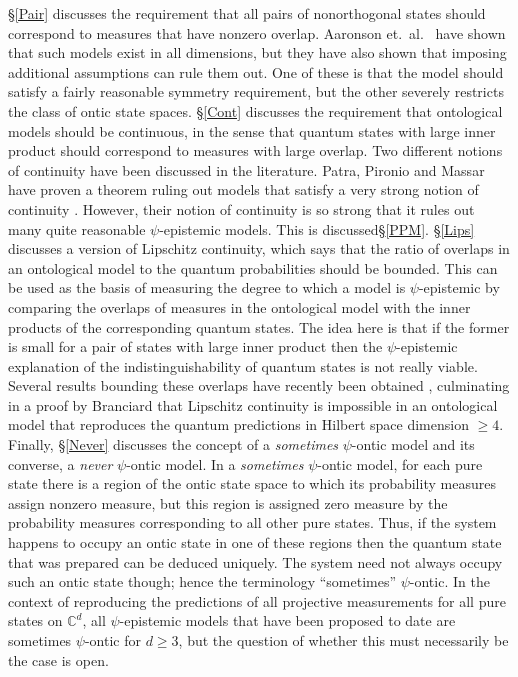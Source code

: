 \documentclass[DIV=calc,fontsize=12pt]{scrartcl} %
\theoremstyle{definition}
\theoremstyle{plain}
\begin{document}
\S\ref{Pair} discusses the requirement that all pairs of nonorthogonal
states should correspond to measures that have nonzero overlap.
Aaronson et.\ al.\ \cite{Aaronson2013} have shown that such models
exist in all dimensions, but they have also shown that imposing
additional assumptions can rule them out.  One of these is that the
model should satisfy a fairly reasonable symmetry requirement, but the
other severely restricts the class of ontic state spaces. \S\ref{Cont}
discusses the requirement that ontological models should be
continuous, in the sense that quantum states with large inner product
should correspond to measures with large overlap.  Two different
notions of continuity have been discussed in the literature.  Patra,
Pironio and Massar have proven a theorem ruling out models that
satisfy a very strong notion of continuity \cite{Patra2013a}.
However, their notion of continuity is so strong that it rules out
many quite reasonable $\psi$-epistemic models.  This is
discussed\S\ref{PPM}.  \S\ref{Lips} discusses a version of Lipschitz
continuity, which says that the ratio of overlaps in an ontological
model to the quantum probabilities should be bounded.  This can be
used as the basis of measuring the degree to which a model is
$\psi$-epistemic by comparing the overlaps of measures in the
ontological model with the inner products of the corresponding quantum
states.  The idea here is that if the former is small for a pair of
states with large inner product then the $\psi$-epistemic explanation
of the indistinguishability of quantum states is not really viable.
Several results bounding these overlaps have recently been obtained
\cite{Maroney2012, Barrett2013, Leifer2014, Branciard2014},
culminating in a proof by Branciard \cite{Branciard2014} that
Lipschitz continuity is impossible in an ontological model that
reproduces the quantum predictions in Hilbert space dimension $\geq
4$.  Finally, \S\ref{Never} discusses the concept of a
\emph{sometimes} $\psi$-ontic model and its converse, a \emph{never}
$\psi$-ontic model.  In a \emph{sometimes} $\psi$-ontic model, for
each pure state there is a region of the ontic state space to which
its probability measures assign nonzero measure, but this region is
assigned zero measure by the probability measures corresponding to all
other pure states.  Thus, if the system happens to occupy an ontic
state in one of these regions then the quantum state that was prepared
can be deduced uniquely.  The system need not always occupy such an
ontic state though; hence the terminology ``sometimes'' $\psi$-ontic.
In the context of reproducing the predictions of all projective
measurements for all pure states on $\mathbb{C}^d$, all
$\psi$-epistemic models that have been proposed to date are sometimes
$\psi$-ontic for $d \geq 3$, but the question of whether this must
necessarily be the case is open.
\end{document}
